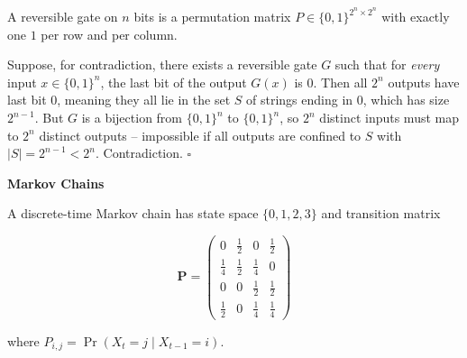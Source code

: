 \documentclass[12pt,a4paper]{exam}
\begin{document}
\begin{questions}
\begin{parts}
\begin{solution}
A reversible gate on $n$ bits is a permutation matrix $P \in \{0,1\}^{2^n \times 2^n}$
with exactly one $1$ per row and per column.

Suppose, for contradiction, there exists a reversible gate $G$ such that for \emph{every}
input $x \in \{0,1\}^n$, the last bit of the output $G(x)$ is $0$.
Then all $2^n$ outputs have last bit $0$, meaning they all lie in the set $S$ of strings
ending in $0$, which has size $2^{n-1}$.
But $G$ is a bijection from $\{0,1\}^n$ to $\{0,1\}^n$, so $2^n$ distinct inputs must map to $2^n$
distinct outputs -- impossible if all outputs are confined to $S$ with $|S|=2^{n-1} < 2^n$.
Contradiction. $\square$
\end{solution}

\end{parts}

\newpage
\question[20] \textbf{Markov Chains}

A discrete-time Markov chain has state space $\{0, 1, 2, 3\}$ and transition matrix

\[
\mathbf{P} =
\begin{pmatrix}
0   & \tfrac{1}{2} & 0            & \tfrac{1}{2} \\[4pt]
\tfrac{1}{4} & \tfrac{1}{2} & \tfrac{1}{4} & 0 \\[4pt]
0   & 0            & \tfrac{1}{2} & \tfrac{1}{2} \\[4pt]
\tfrac{1}{2} & 0            & \tfrac{1}{4} & \tfrac{1}{4}
\end{pmatrix}
\]

where $P_{i,j} = \Pr(X_t = j \mid X_{t-1} = i)$.

\end{questions}
\end{document}
